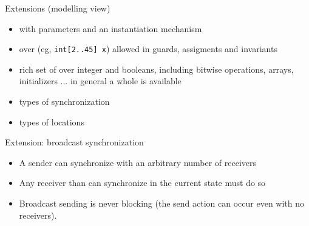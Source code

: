 \documentclass[aspectratio=169]{beamer}
\begin{document}
\begin{slide}{Extensions (modelling view)}
\small

\begin{itemize}
\item {} with \alert{parameters} and an \alert{instantiation mechanism}
\item {} over  (eg, \texttt{int[2..45] x}) allowed in \alert{guards},
\alert{assigments} and \alert{invariants}
\item rich set of  over integer and booleans, including bitwise operations, arrays, initializers ... in general
a whole  is available
\item {} types of \alert{synchronization}
 \item {} types of \alert{locations}
\end{itemize}
\end{slide}




\begin{slide}{Extension: broadcast synchronization}
\small



\begin{itemize}
\item A sender  can synchronize with an arbitrary number of receivers 
\item Any receiver than can synchronize in the current state must do so
\item Broadcast sending is never blocking (the send action can occur even with no receivers).
\end{itemize}

\end{slide}
\end{document}
